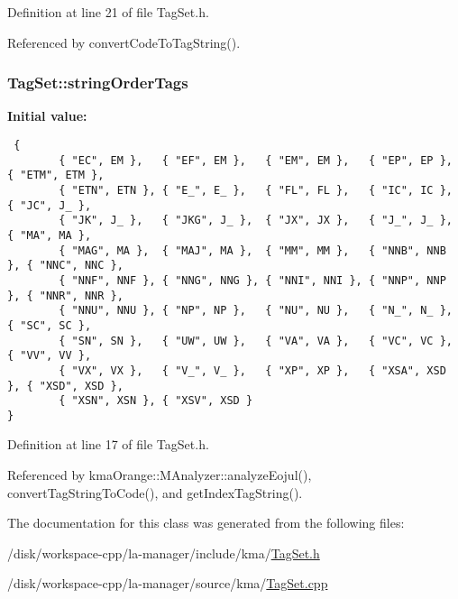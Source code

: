 Definition at line 21 of file TagSet.h.

Referenced by convertCodeToTagString().\hypertarget{classkmaOrange_1_1TagSet_47bb16338b782454284836622d21fa3f}{
\subsubsection[{stringOrderTags}]{ {\bf TagSet::stringOrderTags}}}
\label{classkmaOrange_1_1TagSet_47bb16338b782454284836622d21fa3f}


\textbf{Initial value:}

\begin{Code}\begin{verbatim} {
        { "EC", EM },   { "EF", EM },   { "EM", EM },   { "EP", EP },   { "ETM", ETM },
        { "ETN", ETN }, { "E_", E_ },   { "FL", FL },   { "IC", IC },   { "JC", J_ },
        { "JK", J_ },   { "JKG", J_ },  { "JX", JX },   { "J_", J_ },   { "MA", MA },
        { "MAG", MA },  { "MAJ", MA },  { "MM", MM },   { "NNB", NNB }, { "NNC", NNC },
        { "NNF", NNF }, { "NNG", NNG }, { "NNI", NNI }, { "NNP", NNP }, { "NNR", NNR },
        { "NNU", NNU }, { "NP", NP },   { "NU", NU },   { "N_", N_ },   { "SC", SC },
        { "SN", SN },   { "UW", UW },   { "VA", VA },   { "VC", VC },   { "VV", VV },
        { "VX", VX },   { "V_", V_ },   { "XP", XP },   { "XSA", XSD }, { "XSD", XSD },
        { "XSN", XSN }, { "XSV", XSD }
}
\end{verbatim}
\end{Code}


Definition at line 17 of file TagSet.h.

Referenced by kmaOrange::MAnalyzer::analyzeEojul(), convertTagStringToCode(), and getIndexTagString().

The documentation for this class was generated from the following files:\begin{CompactItemize}
\item 
/disk/workspace-cpp/la-manager/include/kma/\hyperlink{TagSet_8h}{TagSet.h}\item 
/disk/workspace-cpp/la-manager/source/kma/\hyperlink{TagSet_8cpp}{TagSet.cpp}\end{CompactItemize}
